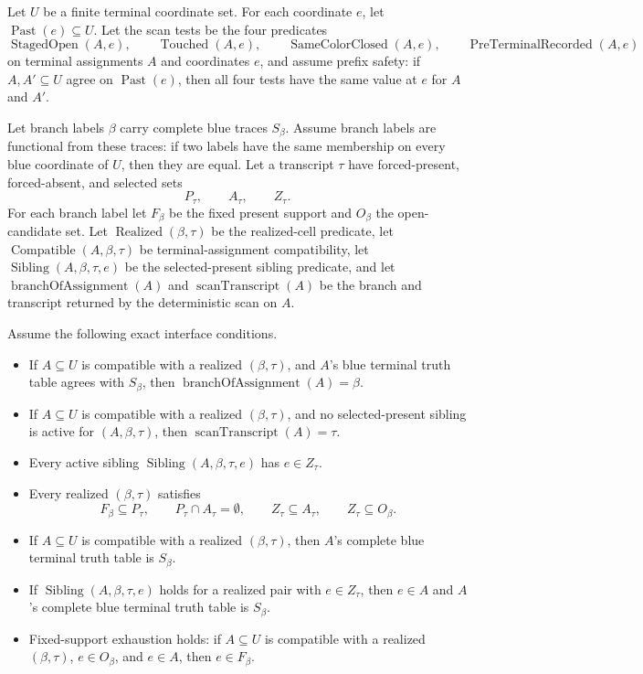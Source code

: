 \begin{helper}
Let \(U\) be a finite terminal coordinate set.  For each coordinate \(e\),
let \(\operatorname{Past}(e)\subseteq U\).  Let the scan tests be the four
predicates
\[
\operatorname{StagedOpen}(A,e),\qquad
\operatorname{Touched}(A,e),\qquad
\operatorname{SameColorClosed}(A,e),\qquad
\operatorname{PreTerminalRecorded}(A,e)
\]
on terminal assignments \(A\) and coordinates \(e\), and assume prefix
safety: if \(A,A'\subseteq U\) agree on \(\operatorname{Past}(e)\), then
all four tests have the same value at \(e\) for \(A\) and \(A'\).

Let branch labels \(\beta\) carry complete blue traces \(S_\beta\).  Assume
branch labels are functional from these traces: if two labels have the same
membership on every blue coordinate of \(U\), then they are equal.  Let a
transcript \(\tau\) have forced-present, forced-absent, and selected sets
\[
P_\tau,\qquad A_\tau,\qquad Z_\tau .
\]
For each branch label let \(F_\beta\) be the fixed present support and
\(O_\beta\) the open-candidate set.  Let
\(\operatorname{Realized}(\beta,\tau)\) be the realized-cell predicate, let
\(\operatorname{Compatible}(A,\beta,\tau)\) be terminal-assignment
compatibility, let
\(\operatorname{Sibling}(A,\beta,\tau,e)\) be the selected-present sibling
predicate, and let
\(\operatorname{branchOfAssignment}(A)\) and
\(\operatorname{scanTranscript}(A)\) be the branch and transcript returned
by the deterministic scan on \(A\).

Assume the following exact interface conditions.
\begin{itemize}
\item If \(A\subseteq U\) is compatible with a realized
\((\beta,\tau)\), and \(A\)'s blue terminal truth table agrees with
\(S_\beta\), then
\(\operatorname{branchOfAssignment}(A)=\beta\).
\item If \(A\subseteq U\) is compatible with a realized
\((\beta,\tau)\), and no selected-present sibling is active for
\((A,\beta,\tau)\), then
\(\operatorname{scanTranscript}(A)=\tau\).
\item Every active sibling \(\operatorname{Sibling}(A,\beta,\tau,e)\)
has \(e\in Z_\tau\).
\item Every realized \((\beta,\tau)\) satisfies
\[
F_\beta\subseteq P_\tau,\qquad
P_\tau\cap A_\tau=\emptyset,\qquad
Z_\tau\subseteq A_\tau,\qquad
Z_\tau\subseteq O_\beta .
\]
\item If \(A\subseteq U\) is compatible with a realized
\((\beta,\tau)\), then \(A\)'s complete blue terminal truth table is
\(S_\beta\).
\item If \(\operatorname{Sibling}(A,\beta,\tau,e)\) holds for a realized
pair with \(e\in Z_\tau\), then \(e\in A\) and \(A\)'s complete blue
terminal truth table is \(S_\beta\).
\item Fixed-support exhaustion holds: if \(A\subseteq U\) is compatible
with a realized \((\beta,\tau)\), \(e\in O_\beta\), and \(e\in A\), then
\(e\in F_\beta\).
\end{itemize}


\end{helper}
